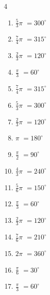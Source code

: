 \begin{multicols}{4}
\begin{enumerate}
  \item $\displaystyle \frac{5}{3}\pi$
        $\displaystyle =300^{\circ}$

  \item $\displaystyle \frac{7}{4}\pi$
        $\displaystyle =315^{\circ}$

  \item $\displaystyle \frac{2}{3}\pi$
        $\displaystyle =120^{\circ}$

  \item $\displaystyle \frac{\pi}{3}$
        $\displaystyle =60^{\circ}$

  \item $\displaystyle \frac{7}{4}\pi$
        $\displaystyle =315^{\circ}$

  \item $\displaystyle \frac{5}{3}\pi$
        $\displaystyle =300^{\circ}$

\columnbreak %

\resetques

  \item $\displaystyle \frac{2}{3}\pi$
        $\displaystyle =120^{\circ}$

  \item $\displaystyle \pi$
        $\displaystyle =180^{\circ}$

  \item $\displaystyle \frac{\pi}{2}$
        $\displaystyle =90^{\circ}$

  \item $\displaystyle \frac{4}{3}\pi$
        $\displaystyle =240^{\circ}$

  \item $\displaystyle \frac{5}{6}\pi$
        $\displaystyle =150^{\circ}$

  \item $\displaystyle \frac{\pi}{3}$
        $\displaystyle =60^{\circ}$

  \item $\displaystyle \frac{2}{3}\pi$
        $\displaystyle =120^{\circ}$

  \item $\displaystyle \frac{7}{6}\pi$
        $\displaystyle =210^{\circ}$

  \item $\displaystyle 2\pi$
        $\displaystyle =360^{\circ}$

  \item $\displaystyle \frac{\pi}{6}$
        $\displaystyle =30^{\circ}$

  \item $\displaystyle \frac{\pi}{3}$
        $\displaystyle =60^{\circ}$


\end{enumerate}
\end{multicols}
